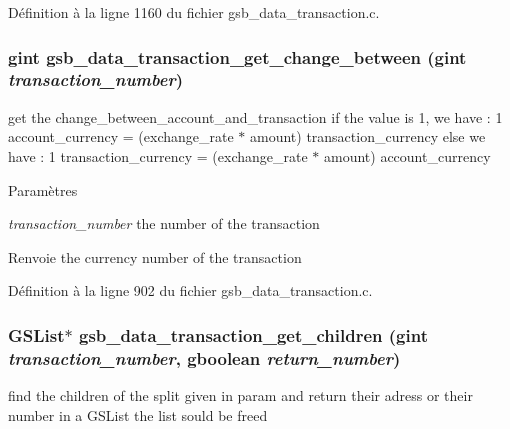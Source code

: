 Définition à la ligne 1160 du fichier gsb\_\-data\_\-transaction.c.

\subsubsection[{gsb\_\-data\_\-transaction\_\-get\_\-change\_\-between}]{\setlength{\rightskip}{0pt plus 5cm}gint gsb\_\-data\_\-transaction\_\-get\_\-change\_\-between (gint {\em transaction\_\-number})}\label{gsb__data__transaction_8c_afd1af457967cb31d2c7396bc1f19adf7}
get the change\_\-between\_\-account\_\-and\_\-transaction if the value is 1, we have : 1 account\_\-currency = (exchange\_\-rate $\ast$ amount) transaction\_\-currency else we have : 1 transaction\_\-currency = (exchange\_\-rate $\ast$ amount) account\_\-currency


\begin{DoxyParams}{Paramètres}
\item[{\em transaction\_\-number}]the number of the transaction\end{DoxyParams}
\begin{DoxyReturn}{Renvoie}
the currency number of the transaction 
\end{DoxyReturn}


Définition à la ligne 902 du fichier gsb\_\-data\_\-transaction.c.

\subsubsection[{gsb\_\-data\_\-transaction\_\-get\_\-children}]{\setlength{\rightskip}{0pt plus 5cm}GSList$\ast$ gsb\_\-data\_\-transaction\_\-get\_\-children (gint {\em transaction\_\-number}, \/  gboolean {\em return\_\-number})}\label{gsb__data__transaction_8c_a7694ce23370b2f50ab250c3162aaa0b3}
find the children of the split given in param and return their adress or their number in a GSList the list sould be freed



